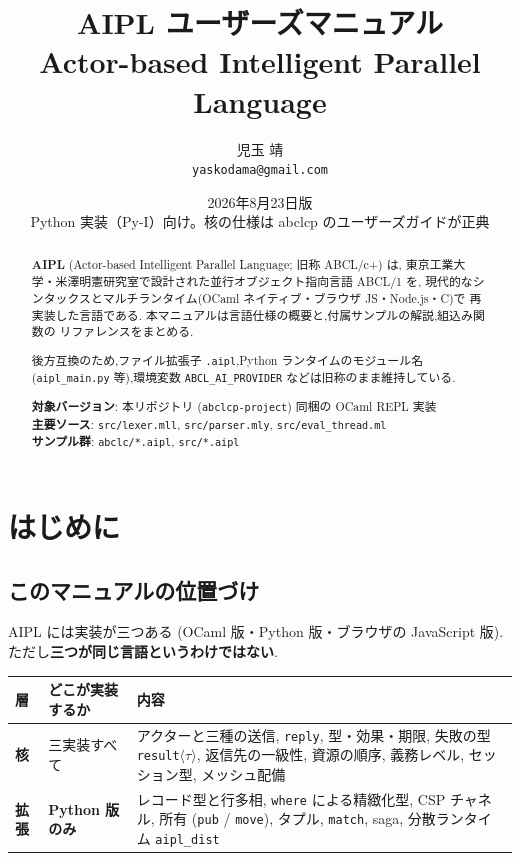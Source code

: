 \documentclass[11pt,a4paper]{article}
\title{AIPL ユーザーズマニュアル\\
\large Actor-based Intelligent Parallel Language}
\author{児玉 靖 \\ \small \texttt{yaskodama@gmail.com}}
\date{2026年8月23日版\\{\small Python 実装（Py-I）向け。核の仕様は abclcp のユーザーズガイドが正典}}
\begin{document}
\maketitle

\begin{abstract}
\textbf{AIPL} (Actor-based Intelligent Parallel Language; 旧称 ABCL/c+) は,
東京工業大学・米澤明憲研究室で設計された並行オブジェクト指向言語 ABCL/1 を,
現代的なシンタックスとマルチランタイム(OCaml ネイティブ・ブラウザ JS・Node.js・C)で
再実装した言語である. 本マニュアルは言語仕様の概要と,付属サンプルの解説,組込み関数の
リファレンスをまとめる.
\par\vspace{4pt}
{\small 後方互換のため,ファイル拡張子 \texttt{.aipl},Python ランタイムのモジュール名
(\texttt{aipl\_main.py} 等),環境変数 \texttt{ABCL\_AI\_PROVIDER} などは旧称のまま維持している.}
\par\vspace{4pt}
\textbf{対象バージョン}: 本リポジトリ (\texttt{abclcp-project}) 同梱の OCaml REPL 実装\\
\textbf{主要ソース}: \texttt{src/lexer.mll}, \texttt{src/parser.mly}, \texttt{src/eval\_thread.ml}\\
\textbf{サンプル群}: \texttt{abclc/*.aipl}, \texttt{src/*.aipl}
\end{abstract}

\tableofcontents
\newpage

\section{はじめに}

\subsection*{このマニュアルの位置づけ}

AIPL には実装が三つある (OCaml 版・Python 版・ブラウザの JavaScript 版).
ただし\textbf{三つが同じ言語というわけではない}.

\begin{center}
\small
\begin{tabular}{@{}lp{3.4cm}p{6.4cm}@{}}
\toprule
層 & どこが実装するか & 内容 \\
\midrule
\textbf{核} & 三実装すべて & アクターと三種の送信, \texttt{reply}, 型・効果・期限,
  失敗の型 \texttt{result}$\langle\tau\rangle$, 返信先の一級性, 資源の順序,
  義務レベル, セッション型, メッシュ配備 \\
\addlinespace
\textbf{拡張} & \textbf{Python 版のみ} & レコード型と行多相, \texttt{where} による精緻化型,
  CSP チャネル, 所有 (\texttt{pub} / \texttt{move}), タプル, \texttt{match},
  saga, 分散ランタイム \texttt{aipl\_dist} \\
\bottomrule
\end{tabular}
\end{center}
\end{document}
